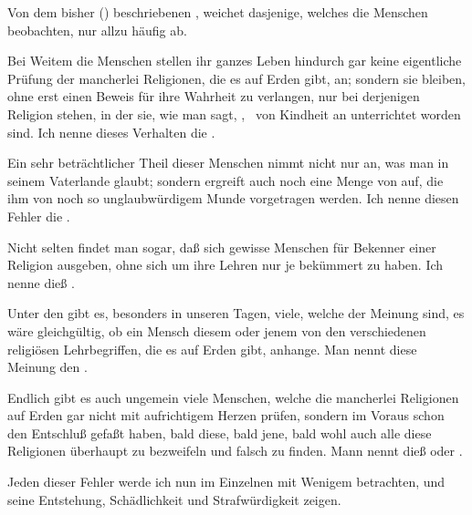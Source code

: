 Von dem bisher () beschriebenen , weichet dasjenige, welches die Menschen  beobachten, nur allzu häufig ab.
\begin{aufza}
\item Bei Weitem die  Menschen stellen ihr ganzes Leben hindurch gar keine eigentliche Prüfung der mancherlei Religionen, die es auf Erden gibt, an; sondern sie bleiben, ohne erst einen Beweis für ihre Wahrheit zu verlangen, nur bei derjenigen Religion stehen, in der sie, wie man sagt, , \dh\ von Kindheit an unterrichtet worden sind. Ich nenne dieses Verhalten die .
\item Ein sehr beträchtlicher Theil dieser Menschen nimmt nicht nur an, was man in seinem Vaterlande  glaubt; sondern ergreift auch noch eine Menge von  auf, die ihm von noch so unglaubwürdigem Munde vorgetragen werden. Ich nenne diesen Fehler die .
\item Nicht selten findet man sogar, daß sich gewisse Menschen für Bekenner einer Religion ausgeben, ohne sich um ihre Lehren nur je bekümmert zu haben. Ich nenne dieß .
\item Unter den  gibt es, besonders in unseren Tagen, viele, welche der Meinung sind, es wäre gleichgültig, ob ein Mensch diesem oder jenem von den verschiedenen religiösen Lehrbegriffen, die es auf Erden gibt, anhange. Man nennt diese Meinung den .
\item Endlich gibt es auch ungemein viele Menschen, welche die mancherlei Religionen auf Erden gar nicht mit aufrichtigem Herzen prüfen, sondern im Voraus schon den Entschluß gefaßt haben, bald diese, bald jene, bald wohl auch alle diese Religionen überhaupt zu bezweifeln und falsch zu finden. Mann nennt dieß  oder .
\end{aufza}\par
Jeden dieser Fehler werde ich nun im Einzelnen mit Wenigem betrachten, und seine Entstehung, Schädlichkeit und Strafwürdigkeit zeigen.

